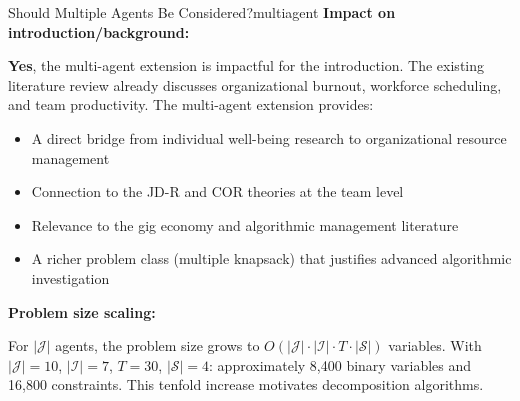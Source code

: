 \documentclass[11pt,a4paper]{article}
\begin{document}
\begin{questionbox}{Should Multiple Agents Be Considered?}{multiagent}
\textbf{Impact on introduction/background:}

\textbf{Yes}, the multi-agent extension is impactful for the introduction. The existing literature review already discusses organizational burnout, workforce scheduling, and team productivity. The multi-agent extension provides:
\begin{itemize}
    \item A direct bridge from individual well-being research to organizational resource management
    \item Connection to the JD-R and COR theories at the team level
    \item Relevance to the gig economy and algorithmic management literature
    \item A richer problem class (multiple knapsack) that justifies advanced algorithmic investigation
\end{itemize}

\textbf{Problem size scaling:}

For $|\mathcal{J}|$ agents, the problem size grows to $O(|\mathcal{J}| \cdot |\mathcal{I}| \cdot T \cdot |\mathcal{S}|)$ variables. With $|\mathcal{J}| = 10$, $|\mathcal{I}| = 7$, $T = 30$, $|\mathcal{S}| = 4$: approximately 8,400 binary variables and 16,800 constraints. This tenfold increase motivates decomposition algorithms.
\end{questionbox}
\end{document}
